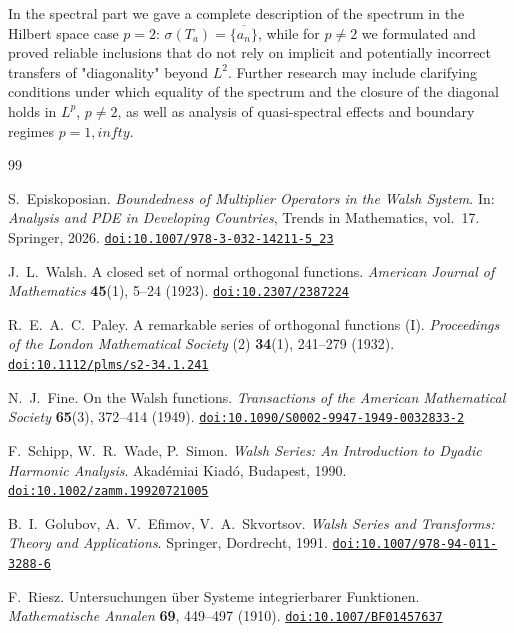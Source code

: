\documentclass[a4paper,12pt]{article}
\theoremstyle{definition}
\theoremstyle{remark}
\theoremstyle{definition}
\newcommand{\DOI}[1]{\href{https://doi.org/#1}{\nolinkurl{doi:#1}}}
\def\infty{infty}%
\begin{document}
In the spectral part we gave a complete description of the spectrum in the Hilbert space case $p=2$:
$\sigma(T_a)=\overline{\{a_n\}}$,
while for $p\neq2$ we formulated and proved reliable inclusions that do not rely
on implicit and potentially incorrect transfers of "diagonality" beyond $L^2$.
Further research may include clarifying conditions under which equality of the spectrum and the closure of the diagonal holds in $L^p$, $p\neq2$,
as well as analysis of quasi-spectral effects and boundary regimes $p=1,\infty$.


\begin{thebibliography}{99}

S.~Episkoposian.
\newblock \emph{Boundedness of Multiplier Operators in the Walsh System}.
\newblock In: \emph{Analysis and PDE in Developing Countries},
Trends in Mathematics, vol.~17.
\newblock Springer, 2026.
\newblock \DOI{10.1007/978-3-032-14211-5\_23}

J.~L.~Walsh.
\newblock A closed set of normal orthogonal functions.
\newblock \emph{American Journal of Mathematics} \textbf{45}(1), 5--24 (1923).
\newblock \DOI{10.2307/2387224}

R.~E.~A.~C.~Paley.
\newblock A remarkable series of orthogonal functions (I).
\newblock \emph{Proceedings of the London Mathematical Society} (2)
\textbf{34}(1), 241--279 (1932).
\newblock \DOI{10.1112/plms/s2-34.1.241}

N.~J.~Fine.
\newblock On the Walsh functions.
\newblock \emph{Transactions of the American Mathematical Society}
\textbf{65}(3), 372--414 (1949).
\newblock \DOI{10.1090/S0002-9947-1949-0032833-2}

F.~Schipp, W.~R.~Wade, P.~Simon.
\newblock \emph{Walsh Series: An Introduction to Dyadic Harmonic Analysis}.
\newblock Akad\'emiai Kiad\'o, Budapest, 1990.
\newblock \DOI{10.1002/zamm.19920721005}

B.~I.~Golubov, A.~V.~Efimov, V.~A.~Skvortsov.
\newblock \emph{Walsh Series and Transforms: Theory and Applications}.
\newblock Springer, Dordrecht, 1991.
\newblock \DOI{10.1007/978-94-011-3288-6}

F.~Riesz.
\newblock Untersuchungen \"uber Systeme integrierbarer Funktionen.
\newblock \emph{Mathematische Annalen} \textbf{69}, 449--497 (1910).
\newblock \DOI{10.1007/BF01457637}


\end{thebibliography}
\end{document}
